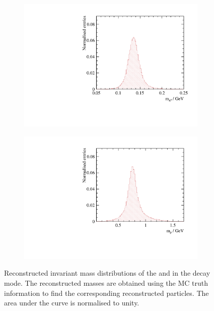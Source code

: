 \begin{figure}[htbp]
\centering
\begin{subfigure}[b]{0.45\textwidth}
 \includegraphics[width=\textwidth]{tau/var3/mPionRhoFit_100GeV_improved_zoom.pdf}
  \caption{}
  \label{fig:tauPionFromRho}
\end{subfigure}
\begin{subfigure}[b]{0.45\textwidth}
 \includegraphics[width=\textwidth]{tau/var3/mRhoRhoFit_100GeV_improved_zoom.pdf}
  \caption{}
  \label{fig:tauRhoFromRho}
\end{subfigure}
\caption
{Reconstructed invariant mass distributions of the \Ppizero and \Prho in the \decayRhoShort decay mode. The reconstructed masses are obtained using the MC truth information to find the corresponding reconstructed particles. The area under the curve is normalised to unity.}
\label{fig:tauRho}
\end{figure}



